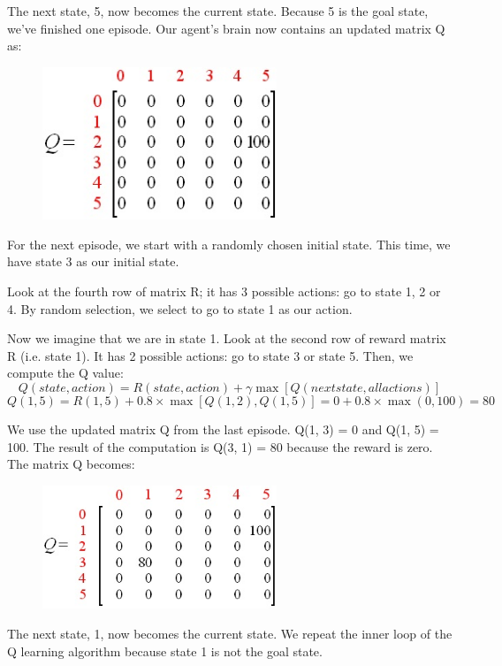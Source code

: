 \documentclass[a4paper, 11pt]{article}
\begin{document}
The next state, 5, now becomes the current state.  Because 5 is the goal state, we've finished one episode.  Our agent's brain now contains an updated matrix Q as:

\begin{figure}[ht]
\centering
\includegraphics[width=7cm]{Pic/q_matrix2}
\end{figure}

For the next episode, we start with a randomly chosen initial state.  This time, we have state 3 as our initial state.

Look at the fourth row of matrix R; it has 3 possible actions: go to state 1, 2 or 4.  By random selection, we select to go to state 1 as our action.

Now we imagine that we are in state 1.  Look at the second row of reward matrix R (i.e. state 1).  It has 2 possible actions: go to state 3 or state 5.  Then, we compute the Q value:
$$Q(state, action) = R(state, action) + \gamma\max[Q(next state, all actions)]$$
$$Q(1, 5) = R(1, 5) + 0.8\times\max[Q(1, 2), Q(1, 5)] = 0 + 0.8\times\max(0, 100) = 80$$

We use the updated matrix Q from the last episode.  Q(1, 3) = 0 and Q(1, 5) = 100.  The result of the computation is Q(3, 1) = 80 because the reward is zero.  The matrix Q becomes:
\begin{figure}[ht]
\centering
\centering\includegraphics[width=7cm]{Pic/q_matrix3}
\end{figure}

The next state, 1, now becomes the current state.  We repeat the inner loop of the Q learning algorithm because state 1 is not the goal state. 
\end{document}
